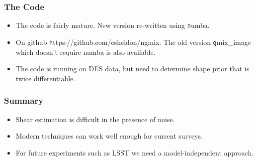 \documentclass{beamer}
\begin{document}
\frame
{
    \frametitle{The Code}

    \begin{itemize}

        \item The code is fairly mature.  New version re-written using {\texttt
            numba}.

        \item On github  {\texttt https://github.com/esheldon/ngmix}. The old
            version {\texttt gmix\_image} which doesn't require numba is also
            available.

        \item The code is running on DES data, but need to determine shape
            prior that is twice differentiable.

    \end{itemize}
}
\frame
{
    \frametitle{Summary}

    \begin{itemize}

        \item Shear estimation is difficult in the presence of noise.

        \item Modern techniques can work well enough for current surveys.

        \item For future experiments such as LSST we need a model-independent
            approach.

    \end{itemize}
}
\end{document}

